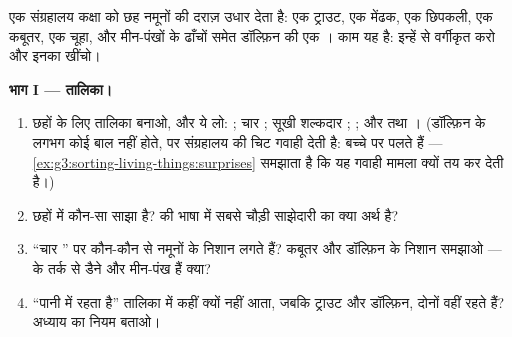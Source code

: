 \begin{problem}[{सप्ताहांत समस्या --- छह नमूने, एक अभिलक्षण-तालिका, और
एक वृक्ष}]\label{pb:g6:classification-kinship:1}
एक संग्रहालय कक्षा को छह नमूनों की दराज़ उधार देता है: एक ट्राउट, एक
मेंढक, एक छिपकली, एक कबूतर, एक चूहा, और मीन-पंखों के ढाँचों समेत
डॉल्फ़िन की एक । काम यह है: इन्हें  से वर्गीकृत करो और
इनका  खींचो।

\medskip\noindent\textbf{भाग I --- तालिका।}
\begin{enumerate}
  \item छहों के लिए तालिका बनाओ, और  ये लो: ; चार ;
        सूखी शल्कदार ; ; और  तथा । (डॉल्फ़िन के लगभग कोई
        बाल नहीं होते, पर संग्रहालय की चिट गवाही देती है: बच्चे  पर
        पलते हैं --- \cref{ex:g3:sorting-living-things:surprises}
        समझाता है कि यह गवाही मामला क्यों तय कर देती है।)
  \item छहों में कौन-सा  साझा है?  की भाषा में सबसे
        चौड़ी साझेदारी का क्या अर्थ है?
  \item ``चार '' पर कौन-कौन से नमूनों के निशान लगते हैं? कबूतर और
        डॉल्फ़िन के निशान समझाओ ---  के तर्क से डैने और मीन-पंख
        हैं क्या?
  \item ``पानी में रहता है'' तालिका में कहीं क्यों नहीं आता, जबकि
        ट्राउट और डॉल्फ़िन, दोनों वहीं रहते हैं? अध्याय का नियम बताओ।
\end{enumerate}


\end{problem}
